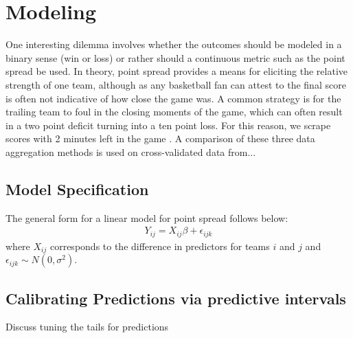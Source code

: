 \section{Modeling}
One interesting dilemma involves whether the outcomes should be modeled in a binary sense (win or loss) or rather should a continuous metric such as the point spread be used.  In theory, point spread provides a means for eliciting the relative strength of one team, although as any basketball fan can attest to the final score is often not indicative of how close the game was.  A common strategy is for the trailing team to foul in the closing moments of the game, which can often result in a two point deficit turning into a ten point loss.  For this reason, we scrape scores with 2 minutes left in the game .  A comparison of these three data aggregation methods is used on cross-validated data from... 
\subsection{Model Specification}
The general form for a linear model for point spread follows below:
\begin{eqnarray}
Y_{ij} = X_{ij} \beta + \epsilon_{ijk}
\label{eq:generic}
\end{eqnarray}
where $X_{ij}$ corresponds to the difference in predictors for teams $i$ and $j$ and $\epsilon_{ijk} \sim N(0,\sigma^2).$ 
\subsection{Calibrating Predictions via predictive intervals} Discuss tuning the tails for predictions

